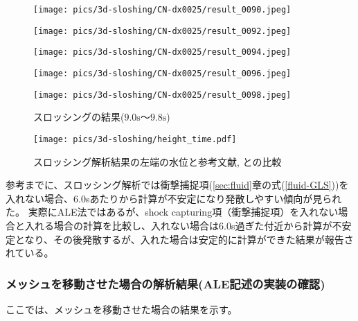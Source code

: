 \begin{figure}[H]
	\centering
	\begin{minipage}[b]{0.19\columnwidth}
	    \centering
	    \texttt{[image: pics/3d-sloshing/CN-dx0025/result\_0090.jpeg]}
	\end{minipage}
	\begin{minipage}[b]{0.19\columnwidth}
	    \centering
	    \texttt{[image: pics/3d-sloshing/CN-dx0025/result\_0092.jpeg]}
	\end{minipage}
	\begin{minipage}[b]{0.19\columnwidth}
	    \centering
	    \texttt{[image: pics/3d-sloshing/CN-dx0025/result\_0094.jpeg]}
	\end{minipage}
	\begin{minipage}[b]{0.19\columnwidth}
	    \centering
	    \texttt{[image: pics/3d-sloshing/CN-dx0025/result\_0096.jpeg]}
	\end{minipage}
	\begin{minipage}[b]{0.19\columnwidth}
	    \centering
	    \texttt{[image: pics/3d-sloshing/CN-dx0025/result\_0098.jpeg]}
	\end{minipage}
	\caption{スロッシングの結果($9.0\mathrm{s}$～$9.8\mathrm{s}$)}
	\label{fig:sloshing-result}
\end{figure}

\begin{figure}[H]
    \centering
	\texttt{[image: pics/3d-sloshing/height\_time.pdf]}
	\caption{スロッシング解析結果の左端の水位と参考文献\cite{Okamoto1992}, \cite{Sakuraba2001}との比較}
	\label{fig:3d-sloshing-result}
\end{figure}

参考までに、スロッシング解析では衝撃捕捉項(\ref{sec:fluid}章の式(\ref{fluid-GLS}))を入れない場合、6.0sあたりから計算が不安定になり発散しやすい傾向が見られた。
実際にALE法ではあるが、shock capturing項（衝撃捕捉項）を入れない場合と入れる場合の計算を比較し、入れない場合は6.0s過ぎた付近から計算が不安定となり、その後発散するが、入れた場合は安定的に計算ができた結果が報告されている\cite{Sakuraba1999}。

\newpage
\subsubsection{メッシュを移動させた場合の解析結果(ALE記述の実装の確認)}
ここでは、メッシュを移動させた場合の結果を示す。

